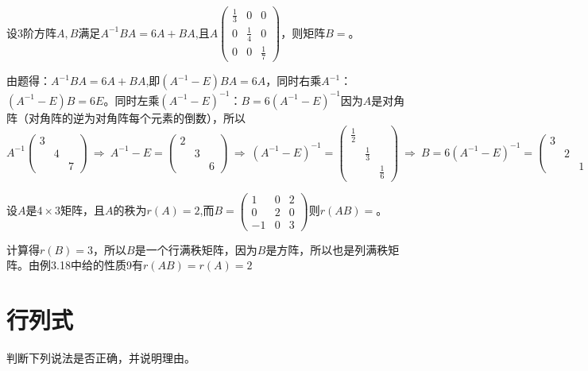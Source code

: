 \documentclass[a4paper]{report}
\begin{document}
\EX

\EX 设3阶方阵$A,B$满足$A^{-1}BA=6A+BA$,且$A
\begin{pmatrix}
\frac{1}{3}&0&0\\
0&\frac{1}{4}&0\\
0&0&\frac{1}{7}
\end{pmatrix}
$，则矩阵$B=$\underline{\hphantom{~~~~~~~~~~~}}。

\begin{jie}
由题得：$A^{-1}BA=6A+BA$,即$(A^{-1}-E)BA=6A$，同时右乘$A^{-1}$：$(A^{-1}-E)B=6E$。同时左乘$(A^{-1}-E)^{-1}$：$B=6(A^{-1}-E)^{-1}$因为$A$是对角阵（对角阵的逆为对角阵每个元素的倒数），所以
\begin{equation*}
A^{-1}
\begin{pmatrix}
3&&\\
&4&\\
&&7
\end{pmatrix}~\Rightarrow~A^{-1}-E=
\begin{pmatrix}
2&&\\
&3&\\
&&6
\end{pmatrix}~\Rightarrow~(A^{-1}-E)^{-1}=
\begin{pmatrix}
\frac{1}{2}&&\\
&\frac{1}{3}&\\
&&\frac{1}{6}
\end{pmatrix}~\Rightarrow~B=6(A^{-1}-E)^{-1}=
\begin{pmatrix}
3&&\\
&2&\\
&&1
\end{pmatrix}
\end{equation*}
\end{jie}

\EX 设$A$是$4\times 3$矩阵，且$A$的秩为$r(A)=2$,而$B=
\begin{pmatrix}
1&0&2\\
0&2&0\\
-1&0&3
\end{pmatrix}
$则$r(AB)=$\underline{\hphantom{~~~~~~~}}。

\begin{jie}
计算得$r(B)=3$，所以$B$是一个行满秩矩阵，因为$B$是方阵，所以也是列满秩矩阵。由例3.18中给的性质9有$r(AB)=r(A)=2$
\end{jie}

\clearpage
\section{行列式}
\EX 判断下列说法是否正确，并说明理由。
\end{document}
